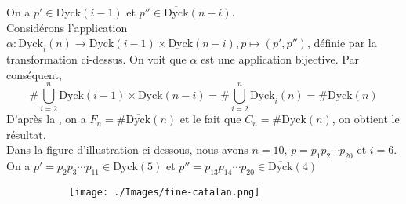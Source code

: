 On a $p'\in \text{Dyck}(i-1) $ et  $p'' \in \overline{\text{Dyck}}(n-i)$. \\
Considérons l'application $\alpha: \overline{\text{Dyck}}_{i}(n) \longrightarrow \text{Dyck}(i-1) \times \overline{\text{Dyck}}(n-i), p \mapsto (p', p'')$, définie par la transformation ci-dessus. On voit que $\alpha$ est une application bijective.\newpage
Par conséquent,
$$\#\underset{i=2}{\overset{n}{\bigcup}}\text{Dyck}(i-1) \times \overline{\text{Dyck}}(n-i)= \# \underset{i=2}{\overset{n}{\bigcup}}\overline{\text{Dyck}}_{i}(n) = \# \overline{\text{Dyck}}(n)$$
D'après la , on a $F_{n} = \#\overline{\text{Dyck}}(n)$ et le fait que $C_{n}=\#\text{Dyck}(n)$, on obtient le résultat.\\
Dans la figure d'illustration ci-dessous, nous avons $n=10$, $p=p_{1}p_{2}\cdots p_{20}$ et $i=6$.\\ 
On a $p'=p_{2}p_{3}\cdots p_{11}\in \text{Dyck}(5)$ et $p''=p_{13}p_{14}\cdots p_{20}\in \overline{\text{Dyck}}(4)$
\begin{figure}[h!]
	\begin{subfigure}[b]{0.38\textwidth}
		\centering
		\texttt{[image: ./Images/fine-catalan.png]}
	\end{subfigure}
\end{figure}\\
























